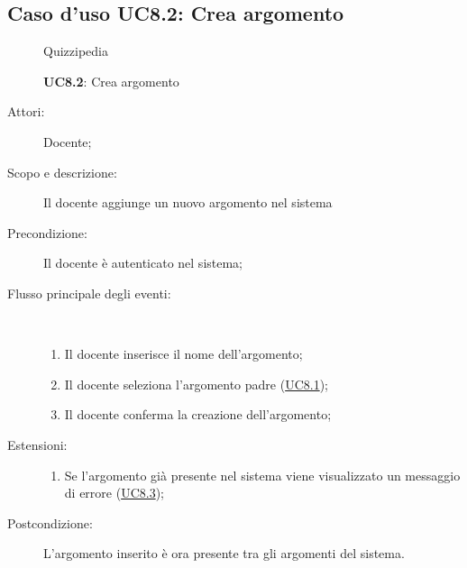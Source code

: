\subsection{Caso d'uso UC8.2: Crea argomento}
	\begin{figure}[H]
		\centering
		\begin{resizedtikzpicture}{\textwidth}
		\begin{umlsystem}[x=0, fill=lightgray!20]{Quizzipedia}
		\end{umlsystem}
		\end{resizedtikzpicture}
		\caption{\textbf{UC8.2}: Crea argomento}
		\label{UC8.2}
	\end{figure}
\begin{description}
\item[Attori:] Docente;
\item[Scopo e descrizione:] Il docente aggiunge un nuovo argomento nel sistema
      \item[Precondizione:] Il docente è autenticato nel sistema;

        \item[Flusso principale degli eventi:] \ 
 \begin{enumerate}
          \item Il docente inserisce il nome dell'argomento;
          \item Il docente seleziona l'argomento padre (\hyperlink{UC8.1}{UC8.1});
          \item Il docente conferma la creazione dell'argomento;

      \end{enumerate}
    \item[Estensioni:]
      \begin{enumerate}
          \item Se l'argomento già presente nel sistema viene visualizzato un messaggio di errore (\hyperlink{UC8.3}{UC8.3});

      \end{enumerate}
    \item[Postcondizione:] L'argomento inserito è ora presente tra gli argomenti del sistema.
  \end{description}
\hypertarget{UC8.3}{}
